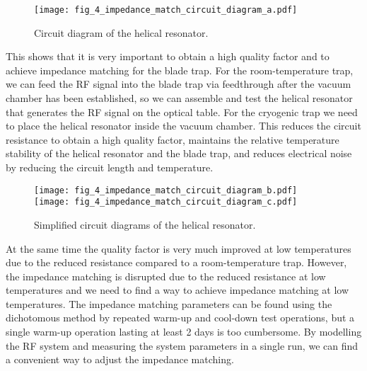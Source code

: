\begin{figure}
    \centering
    \texttt{[image: fig\_4\_impedance\_match\_circuit\_diagram\_a.pdf]}
    \caption{Circuit diagram of the helical resonator.}
    \label{fig:fig_4_impedance_match_circuit_diagram_a}
\end{figure}

This shows that it is very important to obtain a high quality factor and to achieve impedance matching for the blade trap. For the room-temperature trap, we can feed the RF signal into the blade trap via feedthrough after the vacuum chamber has been established, so we can assemble and test the helical resonator that generates the RF signal on the optical table. For the cryogenic trap we need to place the helical resonator inside the vacuum chamber. This reduces the circuit resistance to obtain a high quality factor, maintains the relative temperature stability of the helical resonator and the blade trap, and reduces electrical noise by reducing the circuit length and temperature.

\begin{figure}
    \centering
    \subcaptionbox{\label{fig:fig_4_impedance_match_circuit_diagram_b}}
    {\texttt{[image: fig\_4\_impedance\_match\_circuit\_diagram\_b.pdf]}}
    \subcaptionbox{\label{fig:fig_4_impedance_match_circuit_diagram_c}}
    {\texttt{[image: fig\_4\_impedance\_match\_circuit\_diagram\_c.pdf]}}
    \caption{Simplified circuit diagrams of the helical resonator.}
    \label{fig:fig_4_impedance_match_circuit_diagram}
\end{figure}

At the same time the quality factor is very much improved at low temperatures due to the reduced resistance compared to a room-temperature trap. However, the impedance matching is disrupted due to the reduced resistance at low temperatures and we need to find a way to achieve impedance matching at low temperatures. The impedance matching parameters can be found using the dichotomous method by repeated warm-up and cool-down test operations, but a single warm-up operation lasting at least 2 days is too cumbersome. By modelling the RF system and measuring the system parameters in a single run, we can find a convenient way to adjust the impedance matching.

